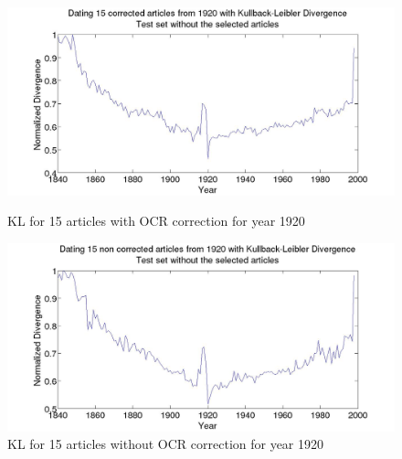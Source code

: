 \begin{figure}[h!]
    \begin{minipage}[b]{0.48\linewidth}
        \includegraphics[scale=0.15]{Pictures/date_articles/kullback_leibler/15articles_1920_KL_years_simulate_articles_corrected_without_articles.jpg}
        \caption{KL for 15 articles with OCR correction for year 1920}
        \label{ArticleKL-C1920}
    \end{minipage}\hfill
    \begin{minipage}[b]{0.5\linewidth}
        \includegraphics[scale=0.15]{Pictures/date_articles/kullback_leibler/15articles_1920_KL_years_simulate_articles_without_correction_without_articles.jpg}
        \caption{KL for 15 articles without OCR correction for year 1920}
        \label{ArticleKL-N1920}
    \end{minipage}\hfill
\end{figure}

